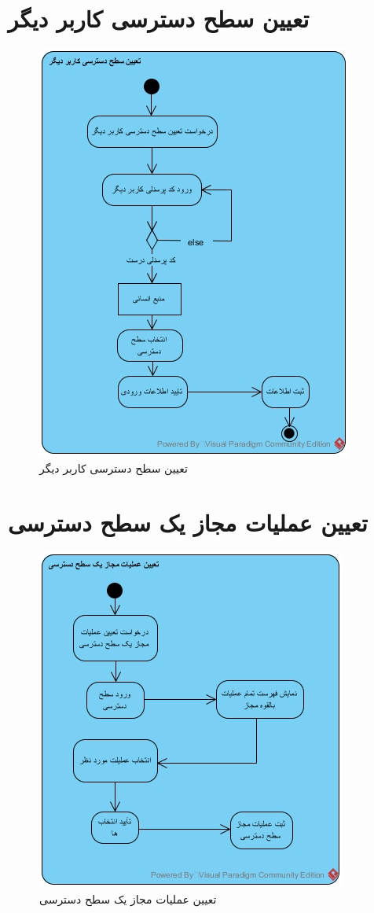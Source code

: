 \section{تعیین سطح دسترسی کاربر دیگر}
\begin{figure}[H]
	\centering
	\includegraphics[scale=0.8]{img/activity/chooseacc}
	\caption{تعیین سطح دسترسی کاربر دیگر}
\end{figure}


\section{تعیین عملیات مجاز یک سطح دسترسی}
\begin{figure}[H]
	\centering
	\includegraphics[scale=0.8]{img/activity/chooselev}
	\caption{تعیین عملیات مجاز یک سطح دسترسی}
\end{figure}


